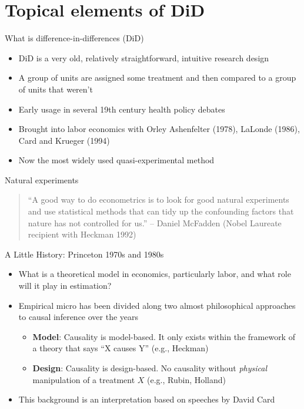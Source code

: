\documentclass{beamer}
\begin{document}
\section{Topical elements of DiD}

\begin{frame}{What is difference-in-differences (DiD)}

\begin{itemize}
\item DiD is a very old, relatively straightforward, intuitive research design
\item A group of units are assigned some treatment and then compared to a group of units that weren't
\item Early usage in several 19th century health policy debates 
\item Brought into labor economics with Orley Ashenfelter (1978), LaLonde (1986), Card and Krueger (1994) 
\item Now the most widely used quasi-experimental method
\end{itemize}

\end{frame}


\begin{frame}{Natural experiments}

\begin{quote}
``A good way to do econometrics is to look for good natural experiments and use statistical methods that can tidy up the confounding factors that nature has not controlled for us.'' -- Daniel McFadden (Nobel Laureate recipient with Heckman 1992)
\end{quote}

\end{frame}





\begin{frame}{A Little History: Princeton 1970s and 1980s}

\begin{itemize}
\item What is a theoretical model in economics, particularly labor, and what role will it play in estimation?
\item Empirical micro has been divided along two almost philosophical approaches to causal inference over the years
	\begin{itemize}
	\item \textbf{Model}: Causality is model-based.  It only exists within the framework of a theory that says ``X causes Y'' (e.g., Heckman)
	\item \textbf{Design}: Causality is design-based.  No causality without \emph{physical} manipulation of a treatment $X$ (e.g., Rubin, Holland)
	\end{itemize}
\item This background is an interpretation based on speeches by David Card
\end{itemize}
\end{frame}
\end{document}
